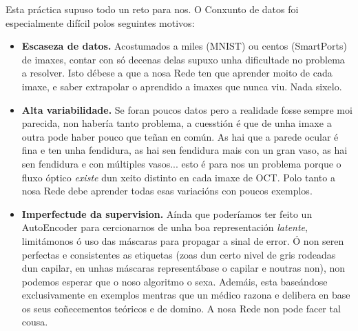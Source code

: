 \documentclass{article}
\begin{document}
Esta práctica supuso todo un reto para nos. O Conxunto de datos foi especialmente difícil polos seguintes motivos:
\begin{itemize}
	\item \textbf{Escaseza de datos.} Acostumados a miles (MNIST) ou centos (SmartPorts) de imaxes, contar con só decenas delas supuxo unha dificultade no problema a resolver. Isto débese a que a nosa Rede ten que aprender moito de cada imaxe, e saber extrapolar o aprendido a imaxes que nunca viu. Nada sixelo.
	\item \textbf{Alta variabilidade.} Se foran poucos datos pero a realidade fosse sempre moi parecida, non habería tanto problema, a cuesstión é que de unha imaxe a outra pode haber pouco que teñan en común. As hai que a parede ocular é fina e ten unha fendidura, as hai sen fendidura mais con un gran vaso, as hai sen fendidura e con múltiples vasos... esto é para nos un problema porque o fluxo óptico \emph{existe} dun xeito distinto en cada imaxe de OCT. Polo tanto a nosa Rede debe aprender todas esas variacións con poucos exemplos.
	\item \textbf{Imperfectude da supervision.} Aínda que poderíamos ter feito un AutoEncoder para cercionarnos de unha boa representación \emph{latente}, limitámonos ó uso das máscaras para propagar a sinal de error. Ó non seren perfectas e consistentes as etiquetas (zoas dun certo nivel de gris rodeadas dun capilar, en unhas máscaras representábase o capilar e noutras non), non podemos esperar que o noso algoritmo o sexa. Ademáis, esta baseándose exclusivamente en exemplos mentras que un médico razona e delibera en base os seus coñecementos teóricos e de domino. A nosa Rede non pode facer tal cousa. 
	
\end{itemize}
\end{document}
